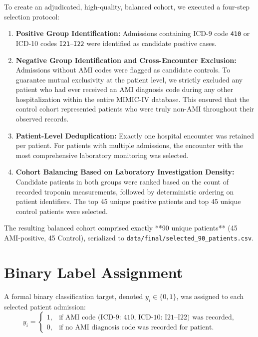 To create an adjudicated, high-quality, balanced cohort, we executed a four-step selection protocol:
\begin{enumerate}
    \item \textbf{Positive Group Identification:} Admissions containing ICD-9 code \texttt{410} or ICD-10 codes \texttt{I21}--\texttt{I22} were identified as candidate positive cases.
    \item \textbf{Negative Group Identification and Cross-Encounter Exclusion:} Admissions without AMI codes were flagged as candidate controls. To guarantee mutual exclusivity at the patient level, we strictly excluded any patient who had ever received an AMI diagnosis code during any other hospitalization within the entire MIMIC-IV database. This ensured that the control cohort represented patients who were truly non-AMI throughout their observed records.
    \item \textbf{Patient-Level Deduplication:} Exactly one hospital encounter was retained per patient. For patients with multiple admissions, the encounter with the most comprehensive laboratory monitoring was selected.
    \item \textbf{Cohort Balancing Based on Laboratory Investigation Density:} Candidate patients in both groups were ranked based on the count of recorded troponin measurements, followed by deterministic ordering on patient identifiers. The top 45 unique positive patients and top 45 unique control patients were selected.
\end{enumerate}

The resulting balanced cohort comprised exactly **90 unique patients** (45 AMI-positive, 45 Control), serialized to \texttt{data/final/selected\_90\_patients.csv}.

\section{Binary Label Assignment}
\label{sec:label_assignment}

A formal binary classification target, denoted $y_i \in \{0, 1\}$, was assigned to each selected patient admission:
\begin{equation}
y_i = 
\begin{cases} 
1, & \text{if AMI code (ICD-9: 410, ICD-10: I21--I22) was recorded,} \\
0, & \text{if no AMI diagnosis code was recorded for patient.}
\end{cases}
\end{equation}

